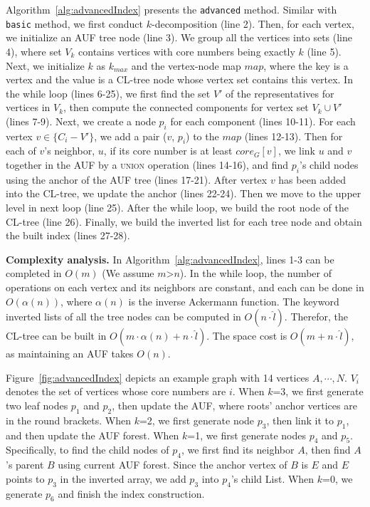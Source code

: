 Algorithm~\ref{alg:advancedIndex} presents the {\tt advanced} method.
Similar with {\tt basic} method, we first conduct $k$-decomposition (line 2).
Then, for each vertex, we initialize an AUF tree node (line 3).
We group all the vertices into sets (line 4),
where set $V_k$ contains vertices with core numbers being exactly $k$ (line 5).
Next, we initialize $k$ as $k_{max}$ and the vertex-node map $map$,
where the key is a vertex and the value is a CL-tree node whose vertex set contains this vertex.
In the while loop (lines 6-25),
we first find the set $V'$ of the representatives for vertices in $V_k$,
then compute the connected components for vertex set $V_k\cup V'$ (lines 7-9).
Next, we create a node $p_i$ for each component (lines 10-11).
For each vertex $v\in \{C_i-V'\}$, we add a pair ($v$, $p_i$) to the $map$ (lines 12-13).
Then for each of $v$'s neighbor, $u$, if its core number is at least $core_G[v]$,
we link $u$ and $v$ together in the AUF by a \textsc{union} operation (lines 14-16),
and find $p_i$'s child nodes using the anchor of the AUF tree (lines 17-21).
After vertex $v$ has been added into the CL-tree, we update the anchor (lines 22-24).
Then we move to the upper level in next loop (line 25).
After the while loop, we build the root node of the CL-tree (line 26).
Finally, we build the inverted list for each tree node and obtain the built index (lines 27-28).


\textbf{Complexity analysis.}
In Algorithm~\ref{alg:advancedIndex}, lines 1-3 can be completed in $O(m)$ (We assume $m$>$n$).
In the while loop, the number of operations on each vertex and its neighbors are constant,
and each can be done in $O(\alpha(n))$, where $\alpha(n)$ is the inverse Ackermann function.
The keyword inverted lists of all the tree nodes can be computed in $O(n\cdot {\widehat l})$.
Therefor, the CL-tree can be built in $O(m\cdot \alpha(n)+n\cdot{\widehat l})$.
The space cost is $O(m+n\cdot{\widehat l})$, as maintaining an AUF takes $O(n)$.


\begin{example}
Figure~\ref{fig:advancedIndex} depicts an example graph with 14 vertices {$A,\cdots,N$}.
$V_i$ denotes the set of vertices whose core numbers are $i$.
When $k$=3, we first generate two leaf nodes $p_1$ and $p_2$,
then update the AUF, where roots' anchor vertices are in the round brackets.
When $k$=2, we first generate node $p_3$, then link it to $p_1$,
and then update the AUF forest.
When $k$=1, we first generate nodes $p_4$ and $p_5$.
Specifically, to find the child nodes of $p_4$,
we first find its neighbor $A$,
then find $A$'s parent $B$ using current AUF forest.
Since the anchor vertex of $B$ is $E$ and $E$ points to $p_3$ in the inverted array,
we add $p_3$ into $p_4$'s child List.
When $k$=0, we generate $p_6$ and finish the index construction.
\end{example}

